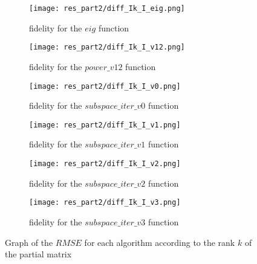 \documentclass{article}
\begin{document}
\begin{figure}[H]
    \centering
    \begin{subfigure}[b]{0.5\textwidth}
        \centering
        \texttt{[image: res\_part2/diff\_Ik\_I\_eig.png]}
        \caption{fidelity for the $eig$ function}
        \label{fig:eig}
    \end{subfigure}\hspace*{\fill}
    \begin{subfigure}[b]{0.5\textwidth}
        \centering
        \texttt{[image: res\_part2/diff\_Ik\_I\_v12.png]}
        \caption{fidelity for the $power\_v12$ function}
        \label{fig:power_v12}
    \end{subfigure}\hspace*{\fill}

    \medskip

    \begin{subfigure}[b]{0.5\textwidth}
        \centering
        \texttt{[image: res\_part2/diff\_Ik\_I\_v0.png]}
        \caption{fidelity for the $subspace\_iter\_v0$ function}
        \label{fig:subspace_iter_v0}
    \end{subfigure}\hspace*{\fill}
    \begin{subfigure}[b]{0.5\textwidth}
        \centering
        \texttt{[image: res\_part2/diff\_Ik\_I\_v1.png]}
        \caption{fidelity for the $subspace\_iter\_v1$ function}
        \label{fig:subspace_iter_v1}
    \end{subfigure}\hspace*{\fill}

    \medskip

    \begin{subfigure}[b]{0.5\textwidth}
        \centering
        \texttt{[image: res\_part2/diff\_Ik\_I\_v2.png]}
        \caption{fidelity for the $subspace\_iter\_v2$ function}
        \label{fig:subspace_iter_v2}
    \end{subfigure}\hspace*{\fill}
    \begin{subfigure}[b]{0.5\textwidth}
        \centering
        \texttt{[image: res\_part2/diff\_Ik\_I\_v3.png]}
        \caption{fidelity for the $subspace\_iter\_v3$ function}
        \label{fig:subspace_iter_v3}
    \end{subfigure}\hspace*{\fill}
    \caption{Graph of the $RMSE$ for each algorithm according to the rank $k$ of the partial matrix}
    \label{fig:fidelity}
\end{figure}
\end{document}
